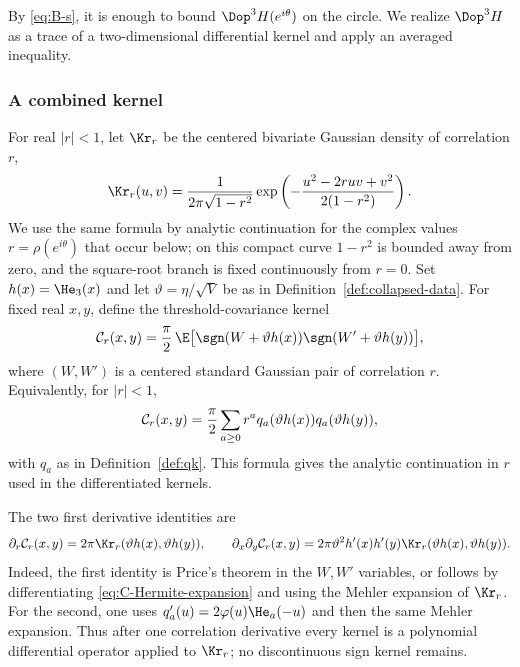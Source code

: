 By \eqref{eq:B-s}, it is enough to bound $\Dop^3H(e^{i\theta})$ on the circle.  We realize $\Dop^3H$ as a trace of a two-dimensional differential kernel and apply an averaged inequality.


\subsubsection{A combined kernel}

For real $|r|<1$, let $\Kr_r$ be the centered bivariate Gaussian density of correlation $r$,
\begin{equation}\label{eq:Kr-kernel}
  \Kr_r(u,v)={1\over2\pi\sqrt{1-r^2}}
  \exp\left(-{u^2-2ruv+v^2\over2(1-r^2)}\right).
\end{equation}
We use the same formula by analytic continuation for the complex values $r=\rho(e^{i\theta})$ that occur below; on this compact curve $1-r^2$ is bounded away from zero, and the square-root branch is fixed continuously from $r=0$.  Set $h(x)=\He_3(x)$ and let $\vartheta=\eta/\sqrt V$ be as in Definition~\ref{def:collapsed-data}.  For fixed real $x,y$, define the threshold-covariance kernel
\begin{equation}\label{eq:threshold-cov-kernel}
  \mathcal C_r(x,y)
  ={\pi\over2}\,\E\bigl[\sgn(W+\vartheta h(x))\sgn(W'+\vartheta h(y))\bigr],
\end{equation}
where $(W,W')$ is a centered standard Gaussian pair of correlation $r$.  Equivalently, for $|r|<1$,
\begin{equation}\label{eq:C-Hermite-expansion}
  \mathcal C_r(x,y)
  ={\pi\over2}\sum_{a\ge0}r^a q_a(\vartheta h(x))q_a(\vartheta h(y)),
\end{equation}
with $q_a$ as in Definition~\ref{def:qk}.  This formula gives the analytic continuation in $r$ used in the differentiated kernels.

The two first derivative identities are
\begin{equation}\label{eq:C-first-derivatives}
  \partial_r\mathcal C_r(x,y)=2\pi\Kr_r(\vartheta h(x),\vartheta h(y)),
  \qquad
  \partial_x\partial_y\mathcal C_r(x,y)
  =2\pi\vartheta^2h'(x)h'(y)\Kr_r(\vartheta h(x),\vartheta h(y)).
\end{equation}
Indeed, the first identity is Price's theorem in the $W,W'$ variables, or follows by differentiating \eqref{eq:C-Hermite-expansion} and using the Mehler expansion of $\Kr_r$.  For the second, one uses $q_a'(u)=2\varphi(u)\He_a(-u)$ and then the same Mehler expansion.  Thus after one correlation derivative every kernel is a polynomial differential operator applied to $\Kr_r$; no discontinuous sign kernel remains.

